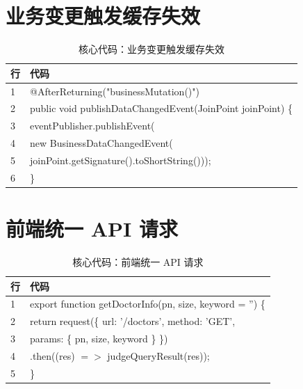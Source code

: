 \documentclass[UTF8,a4paper,12pt,openany,fontset=windows]{ctexrep}
\newcommand{\codefont}{\ttfamily\footnotesize}
\begin{document}
\section{业务变更触发缓存失效}
\begin{table}[H]
  \centering
  \caption{核心代码：业务变更触发缓存失效}
  \begin{tabularx}{\textwidth}{p{1.2cm}L}
    \toprule
    行 & 代码 \\
     & \codefont @AfterReturning("businessMutation()") \\
    2 & \codefont public void publishDataChangedEvent(JoinPoint joinPoint) \{ \\
    3 & \codefont \quad eventPublisher.publishEvent( \\
    4 & \codefont \quad\quad new BusinessDataChangedEvent( \\
    5 & \codefont \quad\quad joinPoint.getSignature().toShortString())); \\
    6 & \codefont \} \\
    \bottomrule
  \end{tabularx}
\end{table}

\section{前端统一 API 请求}
\begin{table}[H]
  \centering
  \caption{核心代码：前端统一 API 请求}
  \begin{tabularx}{\textwidth}{p{1.2cm}L}
    \toprule
    行 & 代码 \\
     & \codefont export function getDoctorInfo(pn, size, keyword = '') \{ \\
    2 & \codefont \quad return request(\{ url: '/doctors', method: 'GET', \\
    3 & \codefont \quad\quad params: \{ pn, size, keyword \} \}) \\
    4 & \codefont \quad\quad .then((res) $=>$ judgeQueryResult(res)); \\
    5 & \codefont \} \\
    \bottomrule
  \end{tabularx}
\end{table}
\end{document}
